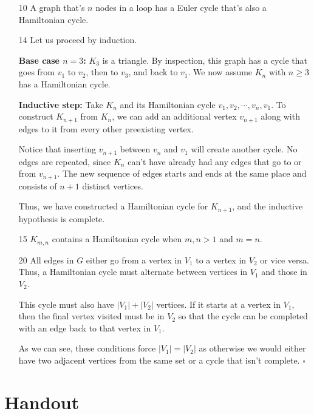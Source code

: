 \documentclass[12pt]{article}
\begin{document}
\begin{enumerate}
    \item[10] A graph that's $n$ nodes in a loop has a Euler cycle that's also a Hamiltonian cycle.
    \item[14] Let us proceed by induction.

          \textbf{Base case $n=3$:}
          $K_3$ is a triangle.
          By inspection, this graph has a cycle that goes from $v_1$ to $v_2$, then to $v_3$, and back to $v_1$.
          We now assume $K_n$ with $n \ge 3$ has a Hamiltonian cycle.

          \textbf{Inductive step:}
          Take $K_n$ and its Hamiltonian cycle $v_1, v_2, \cdots, v_n, v_1$.
          To construct $K_{n+1}$ from $K_n$, we can add an additional vertex $v_{n+1}$ along
          with edges to it from every other preexisting vertex.

          Notice that inserting $v_{n+1}$ between $v_n$ and $v_1$ will create another cycle.
          No edges are repeated, since $K_n$ can't have already had any edges that go to or from $v_{n+1}$.
          The new sequence of edges starts and ends at the same place and consists of $n+1$ distinct vertices.

          Thus, we have constructed a Hamiltonian cycle for $K_{n+1}$, and the inductive hypothesis is complete.
    \item[15] $K_{m,n}$ contains a Hamiltonian cycle when $m,n > 1$ and $m=n$.
    \item[20] All edges in $G$ either go from a vertex in $V_1$ to a vertex in $V_2$ or vice versa.
    Thus, a Hamiltonian cycle must alternate between vertices in $V_1$ and those in $V_2$.

    This cycle must also have $|V_1|+|V_2|$ vertices.
    If it starts at a vertex in $V_1$, then the final vertex visited must be in $V_2$
    so that the cycle can be completed with an edge back to that vertex in $V_1$.
    
    As we can see, these conditions force $|V_1|=|V_2|$ as otherwise
    we would either have two adjacent vertices from the same set or a cycle that isn't complete. $\square$
\end{enumerate}

\pagebreak

\section{Handout}\label{sec:handout}
\end{document}
